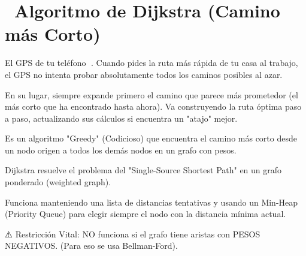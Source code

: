 ﻿\chapter[\emj{🛤️}~Algoritmo de Dijkstra (Camino más Corto)]{~Algoritmo de Dijkstra (Camino más Corto)}

\begin{dsaquees}

El GPS de tu teléfono 📱. Cuando pides la ruta más rápida de tu 
casa al trabajo, el GPS no intenta probar absolutamente todos los
caminos posibles al azar.

En su lugar, siempre expande primero el camino que parece más 
prometedor (el más corto que ha encontrado hasta ahora). Va 
construyendo la ruta óptima paso a paso, actualizando sus cálculos
si encuentra un "atajo" mejor.

Es un algoritmo "Greedy" (Codicioso) que encuentra el camino más corto
desde un nodo origen a todos los demás nodos en un grafo con pesos.

\end{dsaquees}

\begin{dsaotraforma}

Dijkstra resuelve el problema del "Single-Source Shortest Path" en
un grafo ponderado (weighted graph). 

Funciona manteniendo una lista de distancias tentativas y usando un
Min-Heap (Priority Queue) para elegir siempre el nodo con la distancia
mínima actual. 

⚠️ Restricción Vital: NO funciona si el grafo tiene aristas con 
PESOS NEGATIVOS. (Para eso se usa Bellman-Ford).

\end{dsaotraforma}


